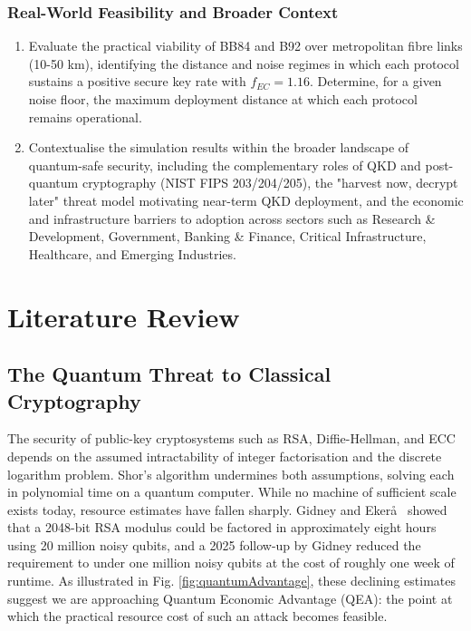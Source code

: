 \documentclass[10pt, a4paper]{report}
\begin{document}
\subsection{Real-World Feasibility and Broader Context}

\begin{enumerate}[label=\textbf{O6.\arabic*}, leftmargin=1.5cm]
    \item Evaluate the practical viability of BB84 and B92 over metropolitan fibre links (10-50 km), identifying the distance and noise regimes in which each protocol sustains a positive secure key rate with $f_{EC} = 1.16$. Determine, for a given noise floor, the maximum deployment distance at which each protocol remains operational.

    \item Contextualise the simulation results within the broader landscape of quantum-safe security, including the complementary roles of QKD and post-quantum cryptography (NIST FIPS 203/204/205), the "harvest now, decrypt later" threat model motivating near-term QKD deployment, and the economic and infrastructure barriers to adoption across sectors such as Research \& Development, Government, Banking \& Finance, Critical Infrastructure, Healthcare, and Emerging Industries.
\end{enumerate}

\chapter{Literature Review}



\section{The Quantum Threat to Classical Cryptography}
The security of public-key cryptosystems such as RSA, Diffie-Hellman, and ECC depends on the assumed intractability of integer factorisation and the discrete logarithm problem. Shor's algorithm \cite{Shor1997} undermines both assumptions, solving each in polynomial time on a quantum computer. While no machine of sufficient scale exists today, resource estimates have fallen sharply. Gidney and Eker\r{a}~\cite{Gidney2021} showed that a 2048-bit RSA modulus could be factored in approximately eight hours using 20 million noisy qubits, and a 2025 follow-up by Gidney \cite{Gidney2025} reduced the requirement to under one million noisy qubits at the cost of roughly one week of runtime. As illustrated in Fig. \ref{fig:quantumAdvantage}, these declining estimates suggest we are approaching Quantum Economic Advantage (QEA): the point at which the practical resource cost of such an attack becomes feasible.
\end{document}
